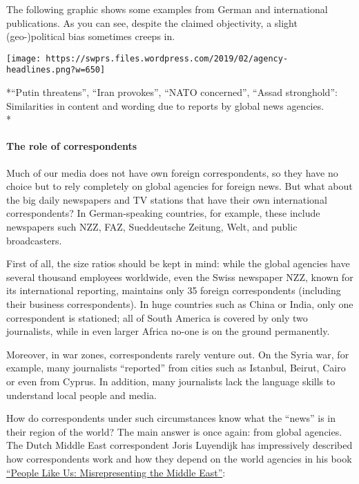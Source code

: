 The following graphic shows some examples from German and international
publications. As you can see, despite the claimed objectivity, a slight
(geo-)political bias sometimes creeps in.

\texttt{[image: https://swprs.files.wordpress.com/2019/02/agency-headlines.png?w=650]}

*``Putin threatens'', ``Iran provokes'', ``NATO concerned'', ``Assad
stronghold'': Similarities in content and wording due to reports by
global news agencies.\\
*

\hypertarget{the-role-of-correspondents}{%
\paragraph{The role of
correspondents}\label{the-role-of-correspondents}}

Much of our media does not have own foreign correspondents, so they have
no choice but to rely completely on global agencies for foreign news.
But what about the big daily newspapers and TV stations that have their
own international correspondents? In German-speaking countries, for
example, these include newspapers such NZZ, FAZ, Sueddeutsche Zeitung,
Welt, and public broadcasters.

First of all, the size ratios should be kept in mind: while the global
agencies have several thousand employees worldwide, even the Swiss
newspaper NZZ, known for its international reporting, maintains only 35
foreign correspondents (including their business correspondents). In
huge countries such as China or India, only one correspondent is
stationed; all of South America is covered by only two journalists,
while in even larger Africa no-one is on the ground permanently.

Moreover, in war zones, correspondents rarely venture out. On the Syria
war, for example, many journalists ``reported'' from cities such as
Istanbul, Beirut, Cairo or even from Cyprus. In addition, many
journalists lack the language skills to understand local people and
media.

How do correspondents under such circumstances know what the ``news'' is
in their region of the world? The main answer is once again: from global
agencies. The Dutch Middle East correspondent Joris Luyendijk has
impressively described how correspondents work and how they depend on
the world agencies in his book
\href{https://www.amazon.com/People-Like-Us-Misrepresenting-Middle/dp/1593762569}{``People
Like Us: Misrepresenting the Middle East''}:

